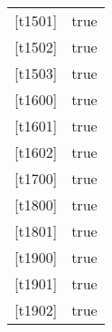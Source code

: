 \documentclass[a4]{article}
\begin{document}
\begin{table}[]
\begin{tabular}{ll}
        \multicolumn{1}{l|}{{[}t1501{]}} & true  \\
        \multicolumn{1}{l|}{{[}t1502{]}} & true  \\
        \multicolumn{1}{l|}{{[}t1503{]}} & true  \\
        \multicolumn{1}{l|}{{[}t1600{]}} & true  \\
        \multicolumn{1}{l|}{{[}t1601{]}} & true  \\
        \multicolumn{1}{l|}{{[}t1602{]}} & true  \\
        \multicolumn{1}{l|}{{[}t1700{]}} & true  \\
        \multicolumn{1}{l|}{{[}t1800{]}} & true  \\
        \multicolumn{1}{l|}{{[}t1801{]}} & true  \\
        \multicolumn{1}{l|}{{[}t1900{]}} & true  \\
        \multicolumn{1}{l|}{{[}t1901{]}} & true  \\
        \multicolumn{1}{l|}{{[}t1902{]}} & true  
    \end{tabular}
\end{table}
\end{document}
